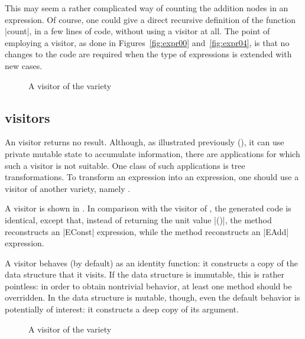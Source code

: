 \documentclass[11pt,a4paper,twoside]{article}
\begin{document}
This may seem a rather complicated way of counting the addition nodes in an
expression. Of course, one could give a direct recursive definition of the
function \oc|count|, in a few lines of code, without using a visitor at all.
The point of employing a visitor, as done in Figures~\ref{fig:expr00}
and~\ref{fig:expr04}, is that no changes to the code are required when the
type of expressions is extended with new cases.


\begin{figure}[p]
\vspace{-\baselineskip}
\caption{A visitor of the \map variety}
\label{fig:expr01}
\end{figure}

\subsection{\map visitors}
\label{sec:intro:map}

An \iter visitor returns no result. Although, as illustrated previously
(), it can use private mutable state to accumulate
information, there are applications for which such a visitor is not suitable.
One class of such applications is tree transformations. To transform an
expression into an expression, one should use a visitor of another variety,
namely \map.

A \map visitor is shown in . In comparison with the \iter
visitor of , the generated code is identical, except that,
instead of returning the unit value \oc|()|, the method
 reconstructs an \oc|EConst| expression, while the
method  reconstructs an \oc|EAdd| expression.

A \map visitor behaves (by default) as an identity function: it constructs a
copy of the data structure that it visits. If the data structure is immutable,
this is rather pointless: in order to obtain nontrivial behavior, at least one
method should be overridden. In the data structure is mutable, though, even
the default behavior is potentially of interest: it constructs a deep copy of
its argument.


\begin{figure}[p]
\vspace{-\baselineskip}
\caption{A visitor of the \mapendo variety}
\label{fig:expr00endo}
\end{figure}
\end{document}
